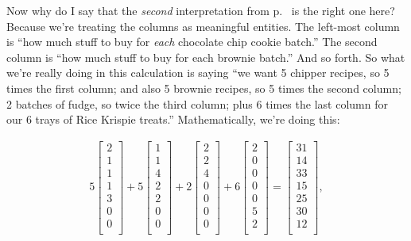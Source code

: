 Now why do I say that the \textit{second} interpretation from
p.~\pageref{twoInterpretations} is the right one here? Because we're treating
the columns as meaningful entities. The left-most column is ``how much stuff to
buy for \textit{each} chocolate chip cookie batch.'' The second column is ``how
much stuff to buy for each brownie batch.'' And so forth. So what we're really
doing in this calculation is saying ``we want 5 chipper recipes, so 5 times the
first column; and also 5 brownie recipes, so 5 times the second column; 2
batches of fudge, so twice the third column; plus 6 times the last column for
our 6 trays of Rice Krispie treats.'' Mathematically, we're doing this:

\vspace{-.15in}
\begin{align*}
5 
\begin{bmatrix}
2  \\
1  \\
1  \\
1  \\
3  \\
0  \\
0  \\
\end{bmatrix} +
5 
\begin{bmatrix}
1\\
1\\
4\\
2\\
2\\
0\\
0\\
\end{bmatrix} +
2 
\begin{bmatrix}
2 \\
2 \\
4 \\
0 \\
0 \\
0 \\
0 \\
\end{bmatrix} +
6 
\begin{bmatrix}
2 \\
0 \\
0 \\
0 \\
0 \\
5 \\
2 \\
\end{bmatrix} =
\begin{bmatrix}
31\\ 14\\ 33\\ 15\\ 25\\ 30\\ 12 \\
\end{bmatrix},
\end{align*}
\vspace{-.15in}

